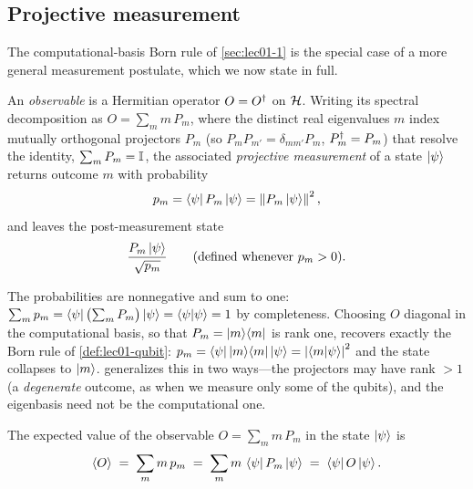 \subsection{Projective measurement}

The computational-basis Born rule of \cref{sec:lec01-1} is the special case of a more
general measurement postulate, which we now state in full.

\begin{definition}\label{def:lec01-projmeas}
An \emph{observable} is a Hermitian operator $O=O^{\dagger}$ on $\mathcal{H}$. Writing its spectral
decomposition as $O=\sum_{m}m\,P_{m}$, where the distinct real eigenvalues $m$ index
mutually orthogonal projectors $P_{m}$ (so $P_{m}P_{m'}=\delta_{mm'}P_{m}$,
$P_{m}^{\dagger}=P_{m}$) that resolve the identity, $\sum_{m}P_{m}=\mathbb{I}$, the associated
\emph{projective measurement} of a state $\ket{\psi}$ returns outcome $m$ with
probability
\begin{equation}\label{eq:lec01-projprob}
  p_{m}=\bra{\psi}P_{m}\ket{\psi}=\left\lVert P_{m}\ket{\psi} \right\rVert^{2},
\end{equation}
and leaves the post-measurement state
\begin{equation}\label{eq:lec01-projpost}
  \frac{P_{m}\ket{\psi}}{\sqrt{p_{m}}}\qquad(\text{defined whenever }p_{m}>0).
\end{equation}
\end{definition}

The probabilities are nonnegative and sum to one:
$\sum_{m}p_{m}=\bra{\psi}\bigl(\sum_{m}P_{m}\bigr)\ket{\psi}=\braket{\psi|\psi}=1$ by
completeness. Choosing $O$ diagonal in the computational basis, so that
$P_{m}=\ket{m}\!\bra{m}$ is rank one, recovers exactly the Born rule of
\cref{def:lec01-qubit}: $p_{m}=\bra{\psi}\ket{m}\!\bra{m}\ket{\psi}=\left\lvert \braket{m|\psi} \right\rvert^{2}$
and the state collapses to $\ket{m}$.  generalizes this in
two ways---the projectors may have rank $>1$ (a \emph{degenerate} outcome, as when we
measure only some of the qubits), and the eigenbasis need not be the computational one.

\begin{proposition}\label{prop:lec01-expect}
The expected value of the observable $O=\sum_{m}m\,P_{m}$ in the state $\ket{\psi}$ is
\begin{equation}\label{eq:lec01-expect}
  \langle O\rangle \;=\; \sum_{m}m\,p_{m}\;=\;\sum_{m}m\,\bra{\psi}P_{m}\ket{\psi}\;=\;\bra{\psi}O\ket{\psi}.
\end{equation}
\end{proposition}

